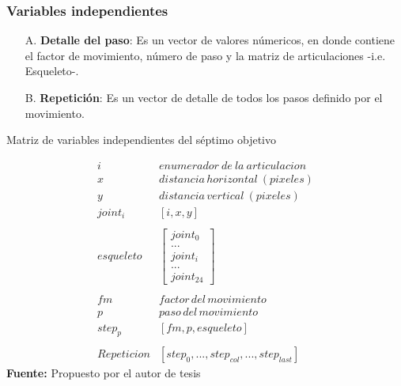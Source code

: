 \subsubsection{Variables independientes} \label{vr:7oi:indep}
\begin{enumerate}
	\item[A.] \textbf{Detalle del paso}: Es un vector de valores n\'umericos, en donde contiene el factor de movimiento, n\'umero de paso y la matriz de articulaciones -i.e. Esqueleto-. 
	\item[B.] \textbf{Repetici\'on}:  Es un vector de detalle de todos los pasos definido por el movimiento.
\end{enumerate}	
\begin{formula}[h]
	\centering
	\caption{Matriz de variables independientes del s\'eptimo objetivo}
	\label{frm:vecEtiq}
	\begin{equation}
\begin{matrix}
i & enumerador\: de\: la\: articulacion \\ 
x & distancia\, horizontal \: (pixeles) \\ 
y & distancia\, vertical\: (pixeles) \\ 
joint_{i}& [i,x,y] \\ 
 & \\ 
esqueleto & \begin{bmatrix}
joint_{0} \\ 
... \\ 
joint_{i}\\ 
... \\ 
joint_{24}
\end{bmatrix}  \\ 
 & \\ 
fm & factor \, del \, movimiento \\ 
p  & paso \, del \,movimiento \\ 
step_{p}  & [fm,p,esqueleto] \\
 & \\ 
Repeticion & [step_{0}, ...,  step_{col}, ..., step_{last}] 
\end{matrix}
	\end{equation}
	\textbf{Fuente:} Propuesto por el autor de tesis
\end{formula}  
\medbreak
